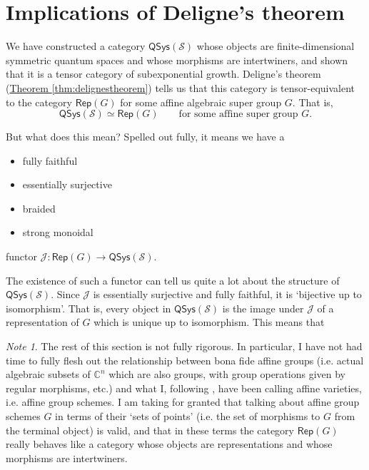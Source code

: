 \documentclass[a4paper,10pt]{scrreprt}
\newcommand{\C}{\mathbb{C}}
\theoremstyle{definition}
\theoremstyle{plain}
\theoremstyle{remark}
\newtheorem{note}{Note}[section]
\begin{document}
\section{Implications of Deligne's theorem} \label{sec:implicationsofdelignestheorem}
We have constructed a category $\mathsf{QSys}(\mathcal{S})$ whose objects are finite-dimensional symmetric quantum spaces and whose morphisms are intertwiners, and shown that it is a tensor category of subexponential growth. Deligne's theorem (\hyperref[thm:delignestheorem]{Theorem \ref*{thm:delignestheorem}}) tells us that this category is tensor-equivalent to the category $\mathsf{Rep}(G)$ for some affine algebraic super group $G$. That is, 
\begin{equation*}
  \mathsf{QSys}(\mathcal{S}) \simeq \mathsf{Rep}(G)\qquad\text{for some affine super group }G.
\end{equation*}

But what does this mean? Spelled out fully, it means we have a 
\begin{itemize}
  \item fully faithful
  \item essentially surjective
  \item braided
  \item strong monoidal 
\end{itemize}
functor $\mathcal{J}\colon \mathsf{Rep}(G) \to \mathsf{QSys}(\mathcal{S})$.

The existence of such a functor can tell us quite a lot about the structure of $\mathsf{QSys}(\mathcal{S})$. Since $\mathcal{J}$ is essentially surjective and fully faithful, it is `bijective up to isomorphism'. That is, every object in $\mathsf{QSys}(\mathcal{S})$ is the image under $\mathcal{J}$ of a representation of $G$ which is unique up to isomorphism. This means that 

\begin{note}
  \label{note:lackofrigor}
  The rest of this section is not fully rigorous. In particular, I have not had time to fully flesh out the relationship between bona fide affine groups (i.e. actual algebraic subsets of $\C^{n}$ which are also groups, with group operations given by regular morphisms, etc.) and what I, following \cite{milne-affine-group-schemes}, have been calling affine varieties, i.e. affine group schemes. I am taking for granted that talking about affine group schemes $G$ in terms of their `sets of points' (i.e. the set of morphisms to $G$ from the terminal object) is valid, and that in these terms the category $\mathsf{Rep}(G)$ really behaves like a category whose objects are representations and whose morphisms are intertwiners.
\end{note}
\end{document}
